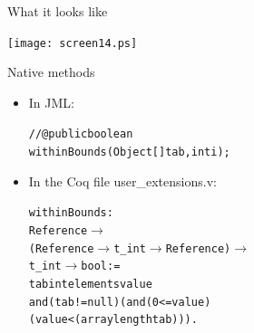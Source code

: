 \documentclass[final,nocolorBG,a4,mobius,nototal,pdf,slideColor]{prosper}
\begin{document}
\begin{slide}{What it looks like}
\vspace*{-1.5em}
\begin{center}
\texttt{[image: screen14.ps]}
\end{center}
\end{slide}




\begin{slide}{Native methods}
\begin{itemize}
\item In JML:
\begin{alltt}
//@ public  boolean 
       withinBounds(Object[] tab, int i);
\end{alltt}
\item In the Coq file user\_extensions.v:
\begin{alltt}
 withinBounds : 
  Reference \(\rightarrow\) 
  (Reference \(\rightarrow\) t\_int \(\rightarrow\) Reference)\(\rightarrow\)  
  t\_int \(\rightarrow\) bool := 
 tab intelements value \Blue{=>} 
    and (tab != null) (and (0 <= value) 
    (value < (arraylength tab))).
\end{alltt}
\end{itemize}
\end{slide}
\end{document}
